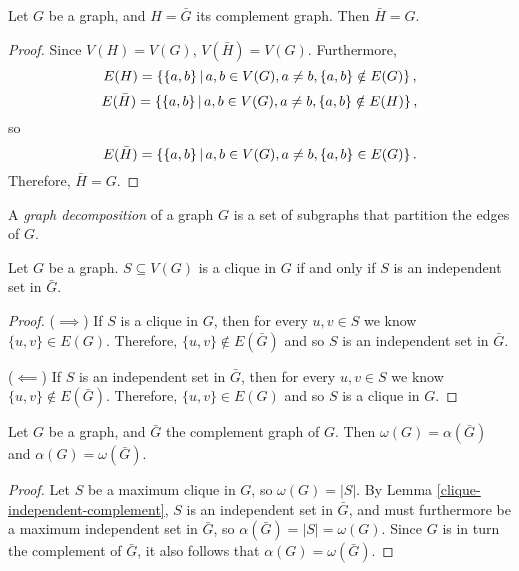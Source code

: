 \begin{prop}
    Let $G$ be a graph, and $H = \bar{G}$ its complement graph. Then $\bar{H} = G$.
\end{prop}

\begin{proof}
    Since $V(H) = V(G)$, $V(\bar{H}) = V(G)$. Furthermore,
    \[E(H) = \left\{\{a, b\} \,\middle|\, a, b \in V(G), a \neq b, \{a, b\} \notin E(G) \right\},\] \[E(\bar{H}) = \left\{\{a, b\} \,\middle|\, a, b \in V(G), a \neq b, \{a, b\} \notin E(H) \right\},\] so \[E(\bar{H}) = \left\{\{a, b\} \,\middle|\, a, b \in V(G), a \neq b, \{a, b\} \in E(G) \right\}.\] Therefore, $\bar{H} = G$.
\end{proof}

\begin{defn}
    A \emph{graph decomposition} of a graph $G$ is a set of subgraphs that partition the edges of $G$.
\end{defn}

\begin{lemma}\label{clique-independent-complement}
    Let $G$ be a graph. $S \subseteq V(G)$ is a clique in $G$ if and only if $S$ is an independent set in $\bar{G}$.
\end{lemma}

\begin{proof}\proofbreak
    ($\implies$) If $S$ is a clique in $G$, then for every $u, v \in S$ we know $\{u, v\} \in E(G)$. Therefore, $\{u, v\} \notin E(\bar{G})$ and so $S$ is an independent set in $\bar{G}$.

    ($\impliedby$) If $S$ is an independent set in $\bar{G}$, then for every $u, v \in S$ we know $\{u, v\} \notin E(\bar{G})$. Therefore, $\{u, v\} \in E(G)$ and so $S$ is a clique in $G$.
\end{proof}

\begin{thm}
    Let $G$ be a graph, and $\bar{G}$ the complement graph of $G$. Then $\omega(G) = \alpha(\bar{G})$ and $\alpha(G) = \omega(\bar{G})$.
\end{thm}

\begin{proof}
    Let $S$ be a maximum clique in $G$, so $\omega(G) = |S|$. By Lemma \ref{clique-independent-complement}, $S$ is an independent set in $\bar{G}$, and must furthermore be a maximum independent set in $\bar{G}$, so $\alpha(\bar{G}) = |S| = \omega(G)$. Since $G$ is in turn the complement of $\bar{G}$, it also follows that $\alpha(G) = \omega(\bar{G})$.
\end{proof}

